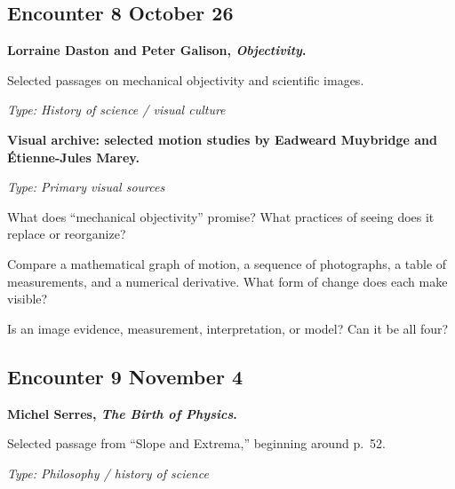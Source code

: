 \subsection*{Encounter 8 \hfill October 26}

\textbf{Lorraine Daston and Peter Galison,
\emph{Objectivity}.}

Selected passages on mechanical objectivity and scientific images.
\parencite{dastongalison2007}

\textit{Type: History of science / visual culture}

\medskip

\textbf{Visual archive: selected motion studies by
Eadweard Muybridge and Étienne-Jules Marey.}

\textit{Type: Primary visual sources}

\begin{description}[leftmargin=1.15in,style=nextline]

\item[\textcolor{LangRed}{READ}]
What does ``mechanical objectivity'' promise? What practices of
seeing does it replace or reorganize?

\item[\textcolor{LangRed}{CONNECT}]
Compare a mathematical graph of motion, a sequence of photographs,
a table of measurements, and a numerical derivative. What form of
change does each make visible?

\item[\textcolor{LangRed}{QUESTION}]
Is an image evidence, measurement, interpretation, or model?
Can it be all four?

\end{description}

\subsection*{Encounter 9 \hfill November 4}

\textbf{Michel Serres, \emph{The Birth of Physics}.}

Selected passage from ``Slope and Extrema,'' beginning around p.~52.

\textit{Type: Philosophy / history of science}

